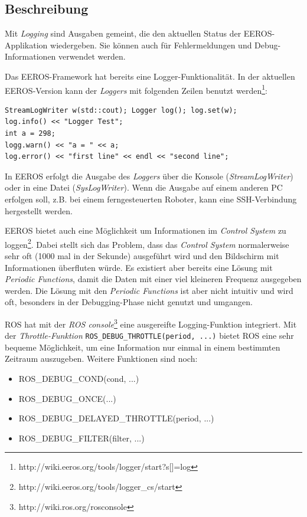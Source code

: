 \subsection{Beschreibung}
Mit \textit{Logging} sind Ausgaben gemeint, die den aktuellen Status der EEROS-Applikation wiedergeben.
Sie können auch für Fehlermeldungen und Debug-Informationen verwendet werden.

Das EEROS-Framework hat bereits eine Logger-Funktionalität.
In der aktuellen EEROS-Version kann der \textit{Loggers}  mit folgenden Zeilen benutzt werden\footnote{http://wiki.eeros.org/tools/logger/start?s[]=log}:
\lstset{language=C++}
\begin{lstlisting}
StreamLogWriter w(std::cout); Logger log(); log.set(w);
log.info() << "Logger Test";
int a = 298;
logg.warn() << "a = " << a;
log.error() << "first line" << endl << "second line"; 
\end{lstlisting}

In EEROS erfolgt die Ausgabe des \textit{Loggers} über die Konsole (\textit{StreamLogWriter}) oder in eine Datei (\textit{SysLogWriter}).
Wenn die Ausgabe auf einem anderen PC erfolgen soll, z.B. bei einem ferngesteuerten Roboter, kann eine SSH-Verbindung hergestellt werden.

EEROS bietet auch eine Möglichkeit um Informationen im \textit{Control System} zu loggen\footnote{http://wiki.eeros.org/tools/logger\_cs/start}.
Dabei stellt sich das Problem, dass das \textit{Control System} normalerweise sehr oft (1000 mal in der Sekunde) ausgeführt wird und den Bildschirm mit Informationen überfluten würde.
Es existiert aber bereits eine Lösung mit \textit{Periodic Functions}, damit die Daten mit einer viel kleineren Frequenz ausgegeben werden.
Die Lösung mit den \textit{Periodic Functions} ist aber nicht intuitiv und wird oft, besonders in der Debugging-Phase nicht genutzt und umgangen.

ROS hat mit der \textit{ROS console}\footnote{http://wiki.ros.org/rosconsole} eine ausgereifte Logging-Funktion integriert.
Mit der \textit{Throttle-Funktion} \texttt{ROS\_DEBUG\_THROTTLE(period, ...)} bietet ROS eine sehr bequeme Möglichkeit, um eine Information nur einmal in einem bestimmten Zeitraum auszugeben.
Weitere Funktionen sind noch:

\begin{itemize}
\item ROS\_DEBUG\_COND(cond, ...)
\item ROS\_DEBUG\_ONCE(...)
\item ROS\_DEBUG\_DELAYED\_THROTTLE(period, ...)
\item ROS\_DEBUG\_FILTER(filter, ...)
\end{itemize}

